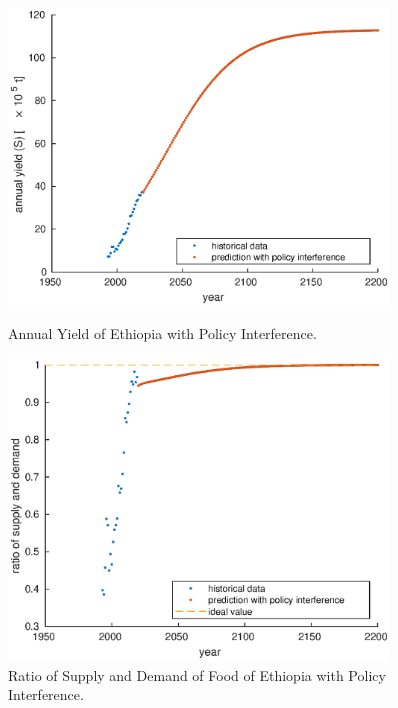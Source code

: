 \documentclass[12pt]{article}
\begin{document}
\begin{figure}[htbp]
    \centering
    \begin{minipage}[t]{0.48\textwidth}
        \centering
        \includegraphics[width=0.9\textwidth]{figure/model/Ethiopia/Ethiopia_yield.eps}
        \caption{Annual Yield of Ethiopia with Policy Interference.\label{fig:Ethiopia_yield}}
    \end{minipage}
    \begin{minipage}[t]{0.48\textwidth}
        \centering
        \includegraphics[width=0.9\textwidth]{figure/model/Ethiopia/Ethiopia_equity.eps}
        \caption{Ratio of Supply and Demand of Food of Ethiopia with Policy Interference.\label{fig:Ethiopia_equity}}
    \end{minipage}
\end{figure}
\end{document}
